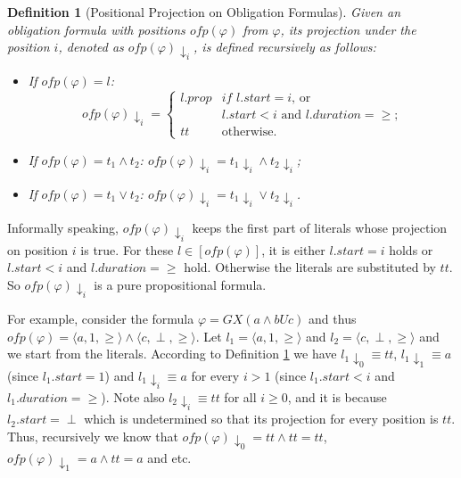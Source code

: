 \documentclass[conference]{IEEEtran}
\newtheorem{definition}{Definition}
\def\phi{\varphi}
\def\tt{\mathit{tt}}
\def\ofp#1{\mathit{ofp}(#1)}
\def\nondeter{\perp}
\begin{document}
\begin{definition}[Positional Projection on Obligation Formulas]\label{def:ofp_projection}
    Given an obligation formula with positions $\ofp{\phi}$ from $\phi$, its projection under the 
    position $i$, denoted 
    as $\ofp{\phi}\!\downarrow_i$, is defined recursively as follows:
    \begin{itemize}
      \item If $\ofp{\phi} = l$: \[
                                 \ofp{\phi}\!\downarrow_i=
                                 \begin{cases}
                                 l.prop & \textit{if } l.start = i \text{, or }\\
                                  & l.start < i \text{ and }l.duration=\geq\text{;}\\
                                 \tt & \text{otherwise.}
                                 \end{cases}
                              \]
      \item If $\ofp{\phi} = t_1\wedge t_2$: $\ofp{\phi}\!\downarrow_i = t_1\!\downarrow_i \wedge t_2\!\downarrow_i$;
      \item If $\ofp{\phi} = t_1\vee t_2$: $\ofp{\phi}\!\downarrow_i = t_1\!\downarrow_i \vee t_2\!\downarrow_i$.
    \end{itemize}
\end{definition}

Informally speaking, $\ofp{\phi}\!\downarrow_i$ keeps the first part of literals whose projection on position $i$ is true. For these $l\in [\ofp{\phi}]$, it is either $l.start = i$ holds or $l.start < i $ and $l.duration=\geq$ hold. Otherwise the literals are substituted  
by $\tt$. So $\ofp{\phi}\!\downarrow_i$ is a pure propositional formula. 

For example, 
consider the formula $\phi=GX(a\wedge bUc)$ and thus $\ofp{\phi}=\langle a, 1, \geq\rangle \wedge\langle c, 
\nondeter, \geq\rangle$. 
Let $l_1=\langle a, 1, \geq\rangle$ and $l_2=\langle c, 
\nondeter, \geq\rangle$ and we start from the literals. According to 
Definition \ref{def:ofp_projection} we have $l_1\!\downarrow_0\equiv\tt$, 
$l_1\!\downarrow_1\equiv a$ (since $l_1.start=1$) and $l_1\!\downarrow_i\equiv a$ for every $i> 1$ (since $l_1.start<i$ and 
$l_1.duration=\geq$). Note also $l_2\!\downarrow_i\equiv\tt$ for all $i\geq 0$, and it is because $l_2.start=
\nondeter$ which is 
undetermined so that its projection for every position is $\tt$. 
Thus, recursively we know that $\ofp{\phi}\!\downarrow_0=\tt\wedge\tt=\tt$, $\ofp{\phi}\!\downarrow_1=a\wedge\tt=a$ and etc.
\end{document}
